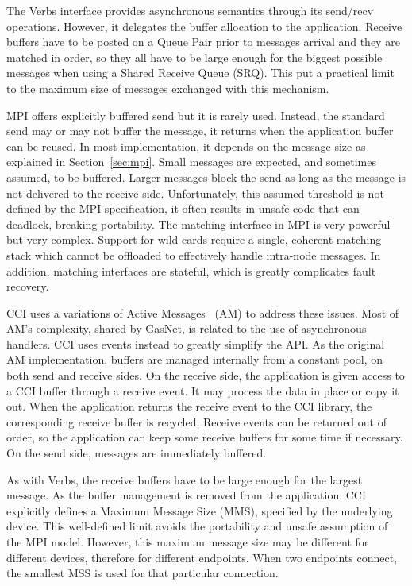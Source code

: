 The Verbs interface provides asynchronous semantics through its send/recv 
operations. However, it delegates the buffer allocation to the application. 
Receive buffers have to be posted on a Queue Pair prior to messages arrival 
and they are matched in order, so they all have to be large enough for the 
biggest possible messages when using a Shared Receive Queue (SRQ). 
This put a practical limit to the maximum size of messages exchanged with 
this mechanism.

MPI offers explicitly buffered send but it is rarely used. Instead, the 
standard send may or may not buffer the message, it returns when 
the application buffer can be reused. In most implementation, it 
depends on the message size as explained in Section~\ref{sec:mpi}. 
Small messages are expected, and sometimes assumed, to be buffered. Larger 
messages block the send as long as the message is not delivered to the receive 
side. Unfortunately, this assumed threshold is not defined by the MPI 
specification, it often results in unsafe code that can deadlock, breaking 
portability. 
The matching interface in MPI is very powerful but very complex. Support 
for wild cards require a single, coherent matching stack which cannot be 
offloaded to effectively handle intra-node messages. In addition, matching 
interfaces are stateful, which is greatly complicates fault recovery.

CCI uses a variations of Active Messages~\cite{voneicken-isca92} (AM) 
to address these issues. 
Most of AM's complexity, shared by GasNet\cite{gasnet}, is related 
to the use of asynchronous handlers. CCI uses events instead to greatly 
simplify the API. As the original AM implementation, buffers are managed 
internally from a constant pool, on both send and receive sides. 
On the receive side, the application is given access to a CCI buffer through 
a receive event. It may process the data in place or copy it out. When the 
application returns the receive event to the CCI library, the corresponding 
receive buffer is recycled. Receive events can be returned out of order, so 
the application can keep some receive buffers for some time if necessary. 
On the send side, messages are immediately buffered.

As with Verbs, the receive buffers have to be large enough for the largest 
message. As the buffer management is removed from the application, CCI 
explicitly defines a Maximum Message Size (MMS), specified by the underlying  
device. This well-defined limit avoids the portability and unsafe assumption 
of the MPI model. However, this maximum message size may be different for 
different devices, therefore for different endpoints. When two endpoints 
connect, the smallest MSS is used for that particular connection.

